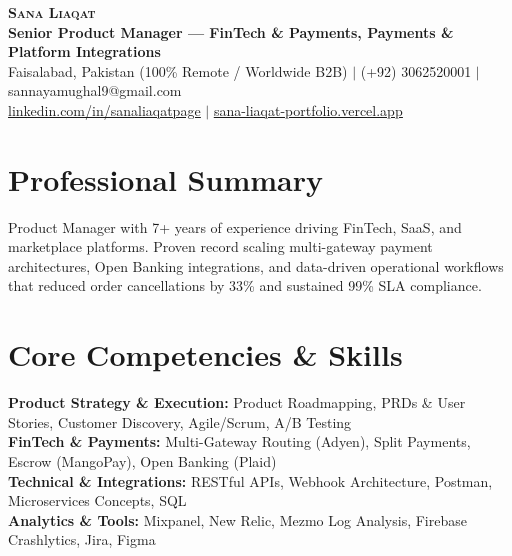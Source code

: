 \documentclass[letterpaper,10pt]{article}
\begin{document}
\begin{center}
    \textbf{\Huge \scshape Sana Liaqat} \\ \vspace{2pt}
    \textbf{\large Senior Product Manager — FinTech \& Payments, Payments \& Platform Integrations} \\ \vspace{3pt}
    \small Faisalabad, Pakistan (100\% Remote / Worldwide B2B) $|$ (+92) 3062520001 $|$ sannayamughal9@gmail.com \\ \vspace{1pt} 
    \small \href{https://www.linkedin.com/in/sanaliaqatpage/}{\underline{linkedin.com/in/sanaliaqatpage}} $|$ \href{https://sana-liaqat-portfolio.vercel.app/}{\underline{sana-liaqat-portfolio.vercel.app}}
\end{center}

\section{Professional Summary}
\small{
Product Manager with 7+ years of experience driving FinTech, SaaS, and marketplace platforms. Proven record scaling multi-gateway payment architectures, Open Banking integrations, and data-driven operational workflows that reduced order cancellations by 33\% and sustained 99\% SLA compliance.
}

\section{Core Competencies \& Skills}
\begin{itemize}[leftmargin=0.15in, label={}]
    \small{\item{
     \textbf{Product Strategy \& Execution:} Product Roadmapping, PRDs \& User Stories, Customer Discovery, Agile/Scrum, A/B Testing \\
     \textbf{FinTech \& Payments:} Multi-Gateway Routing (Adyen), Split Payments, Escrow (MangoPay), Open Banking (Plaid) \\
     \textbf{Technical \& Integrations:} RESTful APIs, Webhook Architecture, Postman, Microservices Concepts, SQL \\
     \textbf{Analytics \& Tools:} Mixpanel, New Relic, Mezmo Log Analysis, Firebase Crashlytics, Jira, Figma
    }}
\end{itemize}

\end{document}
